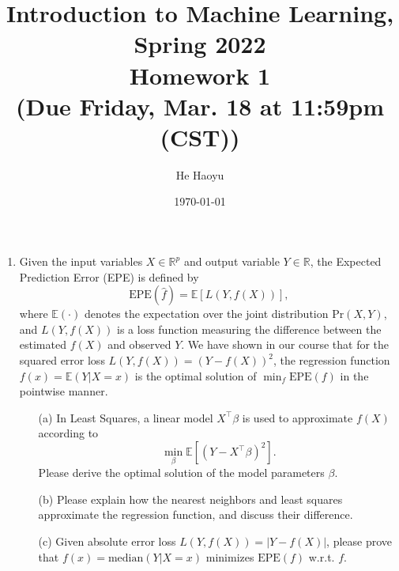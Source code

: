 \documentclass[10pt]{article}
\author{He Haoyu}
\begin{document}
\date{\today}
\title{Introduction to Machine Learning, Spring 2022 \\
	Homework 1\\
	\small (Due Friday, Mar. 18 at 11:59pm (CST))}
\maketitle
\begin{enumerate}[1.]


	\item {} Given the input variables $X \in \mathbb{R}^p$ and output variable $Y \in \mathbb{R}$, the Expected Prediction Error (EPE) is defined by
	      \begin{equation}
		      \text{EPE}(\hat{f}) = \mathbb{E}[L(Y,f(X))],
	      \end{equation}
	      where $\mathbb{E}(\cdot)$ denotes the expectation over the joint distribution $\text{Pr}(X,Y)$, and $L(Y,f(X))$ is a loss function measuring the difference between the estimated $f(X)$ and observed $Y$.
	      We have shown in our course that for the squared error loss $L(Y,f(X))=(Y-f(X))^2$, the regression function $f(x) = \mathbb{E}(Y|X=x)$
	      is the optimal solution of $\min_f \text{EPE}(f)$ in the pointwise manner.
	      \begin{itemize}
		      \item[(a)] In Least Squares, a linear model $X^\top \beta$ is used to approximate $f(X)$ according to
		            \begin{equation}
			            \min_\beta  \mathbb{E}[(Y-X^\top \beta)^2].
		            \end{equation}
		            Please derive the optimal solution of the model parameters $\beta$.~
		      \item[(b)] Please explain how the nearest neighbors and least squares approximate the regression function, and discuss their difference.~
		      \item[(c)] Given absolute error loss $L(Y,f(X))=|Y-f(X)|$, please prove that $f(x) = \text{median}(Y|X=x)$ minimizes $\text{EPE}(f)$ w.r.t. $f$.~
	      \end{itemize}



\end{enumerate}
\end{document}
